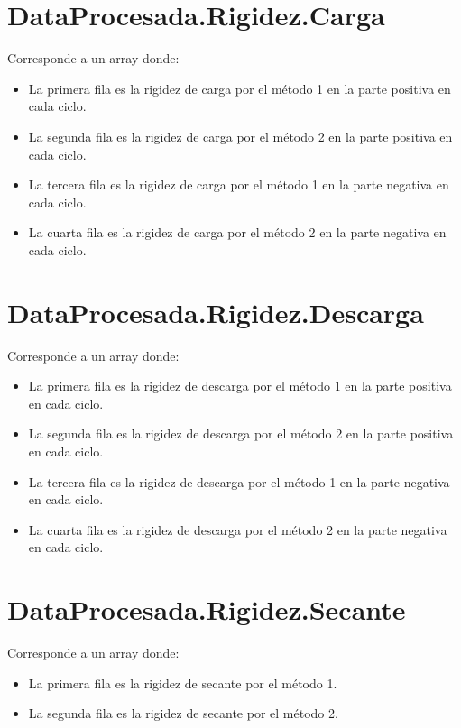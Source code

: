 \documentclass[a4paper, 11pt,article,oneside]{memoir}%
\begin{document}
\section{DataProcesada.Rigidez.Carga}
Corresponde a un array donde: 
\begin{itemize}
    \item La primera fila es la rigidez de carga por el método 1 en la parte positiva en cada ciclo.
    \item  La segunda fila es la rigidez de carga por el método 2 en la parte positiva en cada ciclo.
     \item  La tercera fila es la rigidez de carga por el método 1 en la parte negativa en cada ciclo.
     \item  La cuarta fila es la rigidez de carga por el método 2 en la parte negativa en cada ciclo.
\end{itemize}
\section{DataProcesada.Rigidez.Descarga}
Corresponde a un array donde: 
\begin{itemize}
    \item La primera fila es la rigidez de descarga por el método 1 en la parte positiva en cada ciclo.
    \item  La segunda fila es la rigidez de descarga por el método 2 en la parte positiva en cada ciclo.
     \item  La tercera fila es la rigidez de descarga por el método 1 en la parte negativa en cada ciclo.
     \item  La cuarta fila es la rigidez de descarga por el método 2 en la parte negativa en cada ciclo.
\end{itemize}
\section{DataProcesada.Rigidez.Secante}
Corresponde a un array donde: 
\begin{itemize}
    \item La primera fila es la rigidez de secante por el método 1.
    \item  La segunda fila es la rigidez de secante por el método 2.
\end{itemize}
\newpage
\end{document}
